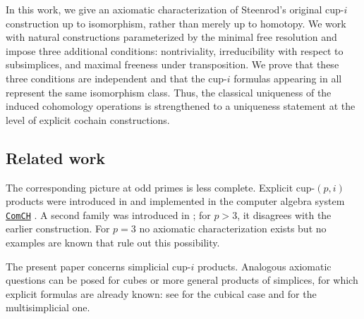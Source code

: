 In this work, we give an axiomatic characterization of Steenrod's original cup-$i$ construction up to isomorphism, rather than merely up to homotopy.
We work with natural constructions parameterized by the minimal free resolution and impose three additional conditions: nontriviality, irreducibility with respect to subsimplices, and maximal freeness under transposition.
We prove that these three conditions are independent and that the cup-$i$ formulas appearing in \cite{steenrod1947products, real1996computability, gonzalez-diaz1999steenrod, mcclure2003multivariable, berger2004combinatorial, medina2020prop1, medina2025fast_sq} all represent the same isomorphism class.
Thus, the classical uniqueness of the induced cohomology operations is strengthened to a uniqueness statement at the level of explicit cochain constructions.

\subsection*{Related work}

The corresponding picture at odd primes is less complete.
Explicit cup-$(p,i)$ products were introduced in \cite{medina2021may_st} and implemented in the computer algebra system \href{https://comch.readthedocs.io/en/latest/}{\texttt{ComCH}} \cite{medina2021comch}.
A second family was introduced in \cite{medina2024connected}; for $p > 3$, it disagrees with the earlier construction.
For $p = 3$ no axiomatic characterization exists but no examples are known that rule out this possibility.

The present paper concerns simplicial cup-$i$ products.
Analogous axiomatic questions can be posed for cubes or more general products of simplices, for which explicit formulas are already known: see \cite{pilarczyk2016cubical, medina2022cube_einfty} for the cubical case and \cite{medina2024multisimplicial} for the multisimplicial one.
